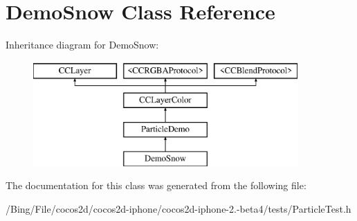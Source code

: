 \hypertarget{interface_demo_snow}{\section{Demo\-Snow Class Reference}
\label{interface_demo_snow}
}
Inheritance diagram for Demo\-Snow\-:\begin{figure}[H]
\begin{center}
\leavevmode
\includegraphics[height=4.000000cm]{interface_demo_snow}
\end{center}
\end{figure}


The documentation for this class was generated from the following file\-:\begin{DoxyCompactItemize}
\item 
/\-Bing/\-File/cocos2d/cocos2d-\/iphone/cocos2d-\/iphone-\/2.-\/beta4/tests/Particle\-Test.\-h\end{DoxyCompactItemize}
